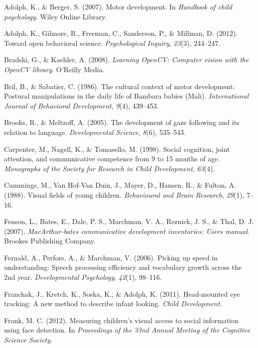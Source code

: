 \documentclass[a4paper,man,apacite,floatsintext,longtable]{apa6}
\begin{document}
\hypertarget{refs}{}
\hypertarget{ref-adolph2007}{}
Adolph, K., \& Berger, S. (2007). Motor development. In \emph{Handbook
of child psychology}. Wiley Online Library.

\hypertarget{ref-adolph2012}{}
Adolph, K., Gilmore, R., Freeman, C., Sanderson, P., \& Millman, D.
(2012). Toward open behavioral science. \emph{Psychological Inquiry},
\emph{23}(3), 244--247.

\hypertarget{ref-bradski2008}{}
Bradski, G., \& Kaehler, A. (2008). \emph{Learning OpenCV: Computer
vision with the OpenCV library}. O'Reilly Media.

\hypertarget{ref-bril1986}{}
Bril, B., \& Sabatier, C. (1986). The cultural context of motor
development: Postural manipulations in the daily life of Bambara babies
(Mali). \emph{International Journal of Behavioral Development},
\emph{9}(4), 439--453.

\hypertarget{ref-brooks2005}{}
Brooks, R., \& Meltzoff, A. (2005). The development of gaze following
and its relation to language. \emph{Developmental Science}, \emph{8}(6),
535--543.

\hypertarget{ref-carpenter1998}{}
Carpenter, M., Nagell, K., \& Tomasello, M. (1998). Social cognition,
joint attention, and communicative competence from 9 to 15 months of
age. \emph{Monographs of the Society for Research in Child Development},
\emph{63}(4).

\hypertarget{ref-cummings1988}{}
Cummings, M., Van Hof-Van Duin, J., Mayer, D., Hansen, R., \& Fulton, A.
(1988). Visual fields of young children. \emph{Behavioural and Brain
Research}, \emph{29}(1), 7--16.

\hypertarget{ref-fenson2007}{}
Fenson, L., Bates, E., Dale, P. S., Marchman, V. A., Reznick, J. S., \&
Thal, D. J. (2007). \emph{MacArthur-bates communicative development
inventories: Users manual}. Brookes Publishing Company.

\hypertarget{ref-fernald2006}{}
Fernald, A., Perfors, A., \& Marchman, V. (2006). Picking up speed in
understanding: Speech processing efficiency and vocabulary growth across
the 2nd year. \emph{Developmental Psychology}, \emph{42}(1), 98--116.

\hypertarget{ref-franchak2011}{}
Franchak, J., Kretch, K., Soska, K., \& Adolph, K. (2011). Head-mounted
eye tracking: A new method to describe infant looking. \emph{Child
Development}.

\hypertarget{ref-frank2012b}{}
Frank, M. C. (2012). Measuring children's visual access to social
information using face detection. In \emph{Proceedings of the 33nd
Annual Meeting of the Cognitive Science Society}.
\end{document}
